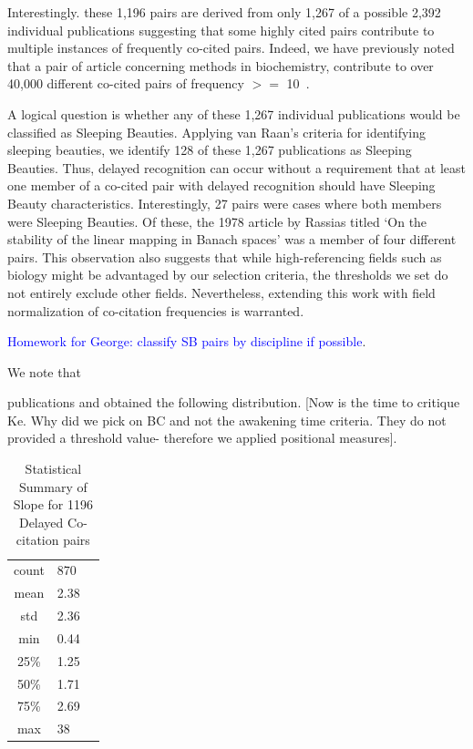 \documentclass[utf8]{frontiersSCNS}
\begin{document}
Interestingly. these 1,196 pairs are derived from only 1,267 of a possible 2,392 individual publications suggesting that some highly cited pairs contribute to multiple instances of frequently co-cited pairs. Indeed, we have previously noted that a pair of article concerning methods in biochemistry, contribute to over 40,000 different co-cited pairs of frequency $>=$ 10~\citep{devarakonda_2020}. 

A logical question is whether any of these 1,267 individual publications would be classified as Sleeping Beauties. Applying van Raan's criteria for identifying sleeping beauties, we identify 128 of these 1,267 publications as Sleeping Beauties. Thus, delayed recognition can occur without a requirement that at least one member of a co-cited pair with delayed recognition should have Sleeping Beauty characteristics. Interestingly, 27 pairs were cases where both members were Sleeping Beauties. Of these, the 1978 article by Rassias titled `On the stability of the linear mapping in Banach spaces' was a member of four different pairs. This observation also suggests that while high-referencing fields such as biology might be advantaged by our selection criteria, the thresholds we set do not entirely exclude other fields. Nevertheless, extending this work with field normalization of co-citation frequencies is warranted.

\textcolor{blue}{Homework for George: classify SB pairs by discipline if possible}.

We note that 
 
 
publications and obtained the following distribution. [Now is the time to critique Ke. Why did we pick on BC and not the awakening time criteria. They do not provided a threshold value- therefore we applied positional measures].



\begin{table}[ht]
\caption{Statistical Summary of Slope for 1196 Delayed Co-citation pairs}%
\centering %
\begin{center}
\begin{tabular}{cll} 
\hline %
count & 870 \\
mean & 2.38 \\
std & 2.36 \\
min & 0.44 \\
25\% & 1.25 \\
50\% & 1.71 \\
75\% & 2.69 \\
max & 38 \\
\hline 
\end{tabular}
\end{center}
\label{tab:table4} %
\end{table}
\end{document}
